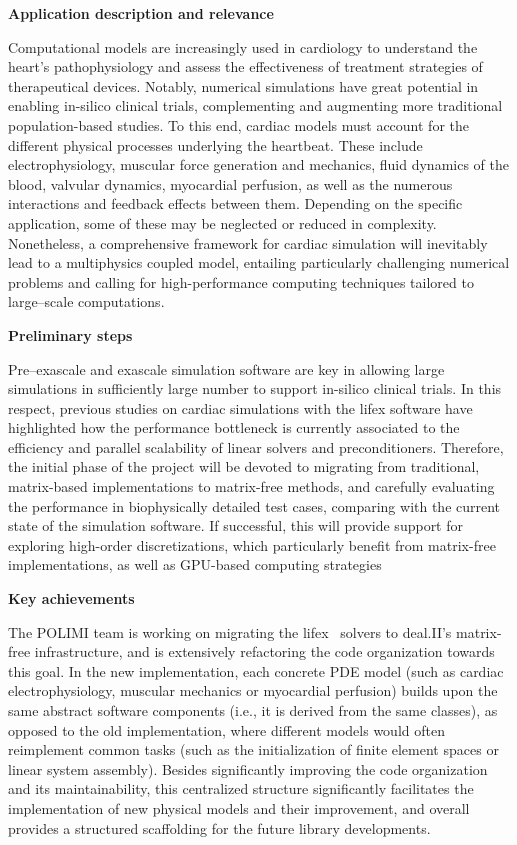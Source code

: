 \documentclass[a4paper,12pt, numbers]{article}
\begin{document}
\noindent\textbf{Application description and relevance}

Computational models are increasingly used in cardiology to understand the heart's pathophysiology and assess the effectiveness of treatment strategies of therapeutical devices.
Notably, numerical simulations have great potential in enabling in-silico clinical trials, complementing and augmenting more traditional population-based studies.
To this end, cardiac models must account for the different physical processes underlying the heartbeat.
These include electrophysiology, muscular force generation and mechanics, fluid dynamics of the blood, valvular dynamics, myocardial perfusion, as well as the numerous interactions and feedback effects between them.
Depending on the specific application, some of these may be neglected or reduced in complexity.
Nonetheless, a comprehensive framework for cardiac simulation will inevitably lead to a multiphysics coupled model, entailing particularly challenging numerical problems and calling for high-performance computing techniques tailored to large--scale computations.

\noindent\textbf{Preliminary steps}

Pre--exascale and exascale simulation software are key in allowing large simulations in sufficiently large number to support in-silico clinical trials. In this respect, previous studies on cardiac simulations with the lifex software have highlighted how the performance bottleneck is currently associated to the efficiency and parallel scalability of linear solvers and preconditioners.
Therefore, the initial phase of the project will be devoted to migrating from traditional, matrix-based implementations to matrix-free methods, and carefully evaluating the performance in biophysically detailed test cases, comparing with the current state of the simulation software.
If successful, this will provide support for exploring high-order discretizations, which particularly benefit from matrix-free implementations, as well as GPU-based computing strategies

\noindent\textbf{Key achievements}

The POLIMI team is working on migrating the lifex~\cite{lifex2.0} solvers to deal.II's matrix-free infrastructure, and is extensively refactoring the code organization towards this goal. In the new implementation, each concrete PDE model (such as cardiac electrophysiology, muscular mechanics or myocardial perfusion) builds upon the same abstract software components (i.e., it is derived from the same classes), as opposed to the old implementation, where different models would often reimplement common tasks (such as the initialization of finite element spaces or linear system assembly). Besides significantly improving the code organization and its maintainability, this centralized structure significantly facilitates the implementation of new physical models and their improvement, and overall provides a structured scaffolding for the future library developments.
\end{document}
